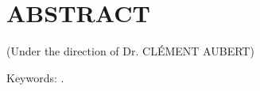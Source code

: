 \section*{\uppercase{Abstract}}
\label{sec:abstract}

\makeatletter
\noindent{\MakeUppercase {\@author}}

\noindent{\@title}
\makeatother

\noindent(Under the direction of Dr. {\MakeUppercase {Cl{\'{e}}ment Aubert}})

\vspace{2em}
\noindent

\vspace{2em}
\noindent Keywords: \mykeywords.